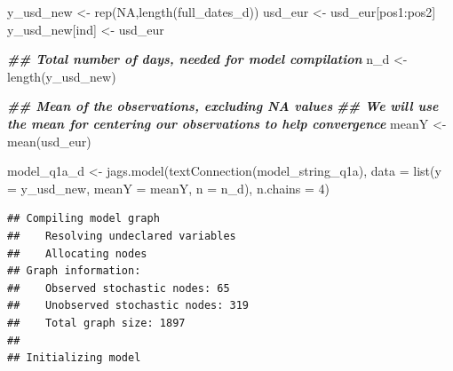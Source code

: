 \documentclass[
]{article}
\newenvironment{Shaded}{\begin{snugshade}}{\end{snugshade}}
\newcommand{\AttributeTok}[1]{\textcolor[rgb]{0.77,0.63,0.00}{#1}}
\newcommand{\ConstantTok}[1]{\textcolor[rgb]{0.00,0.00,0.00}{#1}}
\newcommand{\DecValTok}[1]{\textcolor[rgb]{0.00,0.00,0.81}{#1}}
\newcommand{\DocumentationTok}[1]{\textcolor[rgb]{0.56,0.35,0.01}{\textbf{\textit{#1}}}}
\newcommand{\FunctionTok}[1]{\textcolor[rgb]{0.00,0.00,0.00}{#1}}
\newcommand{\NormalTok}[1]{#1}
\newcommand{\OtherTok}[1]{\textcolor[rgb]{0.56,0.35,0.01}{#1}}
\newcommand{\SpecialCharTok}[1]{\textcolor[rgb]{0.00,0.00,0.00}{#1}}
\begin{document}
\begin{Shaded}
\begin{Highlighting}[]
\NormalTok{y\_usd\_new }\OtherTok{\textless{}{-}} \FunctionTok{rep}\NormalTok{(}\ConstantTok{NA}\NormalTok{,}\FunctionTok{length}\NormalTok{(full\_dates\_d))}
\NormalTok{usd\_eur }\OtherTok{\textless{}{-}}\NormalTok{ usd\_eur[pos1}\SpecialCharTok{:}\NormalTok{pos2]}
\NormalTok{y\_usd\_new[ind] }\OtherTok{\textless{}{-}}\NormalTok{ usd\_eur}



\DocumentationTok{\#\# Total number of days, needed for model compilation}
\NormalTok{n\_d }\OtherTok{\textless{}{-}} \FunctionTok{length}\NormalTok{(y\_usd\_new)}

\DocumentationTok{\#\# Mean of the observations, excluding NA values}
\DocumentationTok{\#\# We will use the mean for centering our observations to help convergence}
\NormalTok{meanY }\OtherTok{\textless{}{-}} \FunctionTok{mean}\NormalTok{(usd\_eur)}

\NormalTok{model\_q1a\_d }\OtherTok{\textless{}{-}} \FunctionTok{jags.model}\NormalTok{(}\FunctionTok{textConnection}\NormalTok{(model\_string\_q1a), }
                      \AttributeTok{data =} \FunctionTok{list}\NormalTok{(}\AttributeTok{y =}\NormalTok{ y\_usd\_new, }\AttributeTok{meanY =}\NormalTok{ meanY,  }\AttributeTok{n =}\NormalTok{ n\_d), }\AttributeTok{n.chains =} \DecValTok{4}\NormalTok{)}
\end{Highlighting}
\end{Shaded}

\begin{verbatim}
## Compiling model graph
##    Resolving undeclared variables
##    Allocating nodes
## Graph information:
##    Observed stochastic nodes: 65
##    Unobserved stochastic nodes: 319
##    Total graph size: 1897
## 
## Initializing model
\end{verbatim}
\end{document}
